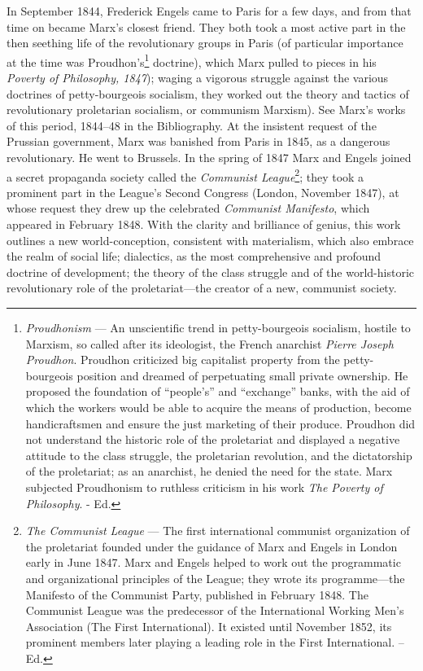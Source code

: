 \documentclass[a4paper,12pt]{book}
\begin{document}
In September 1844, Frederick Engels came to Paris for a few days, and from that time on became Marx’s closest friend. They both took a most active part in the then seething life of the revolutionary groups in Paris (of particular importance at the time was Proudhon’s\footnote{\textit{Proudhonism} — An unscientific trend in petty-bourgeois socialism, hostile to Marxism, so called after its ideologist, the French anarchist \emph{Pierre Joseph Proudhon}. Proudhon criticized big capitalist property from the petty-bourgeois position and dreamed of perpetuating small private ownership. He proposed the foundation of “people’s” and “exchange” banks, with the aid of which the workers would be able to acquire the means of production, become handicraftsmen and ensure the just marketing of their produce. Proudhon did not understand the historic role of the proletariat and displayed a negative attitude to the class struggle, the proletarian revolution, and the dictatorship of the proletariat; as an anarchist, he denied the need for the state. Marx subjected Proudhonism to ruthless criticism in his work \emph{The Poverty of Philosophy}. - Ed.} doctrine), which Marx pulled to pieces in his \emph{Poverty of Philosophy, 1847}); waging a vigorous struggle against the various doctrines of petty-bourgeois socialism, they worked out the theory and tactics of revolutionary proletarian socialism, or communism Marxism). See Marx’s works of this period, 1844--48 in the Bibliography. At the insistent request of the Prussian government, Marx was banished from Paris in 1845, as a dangerous revolutionary. He went to Brussels. In the spring of 1847 Marx and Engels joined a secret propaganda society called the \emph{Communist League}\footnote{\emph{The Communist League} — The first international communist organization of the proletariat founded under the guidance of Marx and Engels in London early in June 1847. Marx and Engels helped to work out the programmatic and organizational principles of the League; they wrote its programme—the Manifesto of the Communist Party, published in February 1848. The Communist League was the predecessor of the International Working Men’s Association (The First International). It existed until November 1852, its prominent members later playing a leading role in the First International. -- Ed.}; they took a prominent part in the League’s Second Congress (London, November 1847), at whose request they drew up the celebrated \emph{Communist Manifesto}, which appeared in February 1848. With the clarity and brilliance of genius, this work outlines a new world-conception, consistent with materialism, which also embrace the realm of social life; dialectics, as the most comprehensive and profound doctrine of development; the theory of the class struggle and of the world-historic revolutionary role of the proletariat—the creator of a new, communist society.
\end{document}
